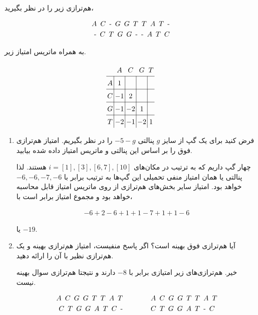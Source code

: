 \documentclass{scribe-cgenomics}
\begin{document}
\bigbreak
\begin{prob}
هم‌ترازی زیر را در نظر بگیرید،

\begin{align*}
A \enspace C \enspace \text{-} \enspace G \enspace G \enspace T \enspace T \enspace A \enspace T \enspace \text{-} \\
\text{-} \enspace C \enspace T \enspace G \enspace G \enspace \text{-} \enspace \text{-} \enspace A \enspace T \enspace C \\
\end{align*}

به همراه ماتریس امتیاز زیر.

$$
\arraycolsep=1.4pt\def\arraystretch{1.5}
\begin{array}{c|c|c|c|c}
 & A & C & G & T \\ \hline
A & 1 & & & \\ \hline
C & -1 & 2 & & \\ \hline
G & -1 & -2 & 1 & \\ \hline
T & -2 & -1 & -2 & 1
\end{array}
$$

\begin{enumerate}
\item{
فرض کنید برای یک گپ از سایز
$g$
پنالتی
$-5-g$
را در نظر بگیریم. امتیاز هم‌ترازی فوق را بر اساس این پنالتی و ماتریس امتیاز داده شده بیابید.


\begin{حل}
چهار گپ داریم که به ترتیب در مکان‌های
$i = [1], [3], [6, 7], [10]$
هستند. لذا پنالتی یا همان امتیاز منفی تحمیلی این گپ‌ها به ترتیب برابر با
$-6, -6, -7, -6$
خواهد بود. امتیاز سایر بخش‌های هم‌ترازی از روی ماتریس امتیاز قابل محاسبه خواهد بود و مجموع امتیاز برابر است با،

\begin{align*}
-6 + 2 - 6 + 1 + 1 - 7 + 1 + 1 - 6
\end{align*}

یا
$-19$.
\end{حل}


}
\item{
آیا هم‌ترازی فوق بهینه است؟ اگر پاسخ منفیست، امتیاز هم‌ترازی بهینه و یک هم‌ترازی نظیر با آن را ارائه دهید.


\begin{حل}
خیر. هم‌ترازی‌های زیر امتیازی برابر با
$-8$
دارند و نتیجتا هم‌ترازی سوال بهینه نیست.

\begin{align*}
A \enspace C \enspace G \enspace G \enspace T \enspace T \enspace A \enspace T \qquad \qquad & A \enspace C \enspace G \enspace G \enspace T \enspace T \enspace A \enspace T \\
C \enspace T \enspace G \enspace G \enspace A \enspace T \enspace C \enspace \text{-} \qquad \qquad & C \enspace T \enspace G \enspace G \enspace A \enspace T \enspace \text{-} \enspace C \\
\end{align*}


\end{حل}}
\end{enumerate}
\end{prob}
\end{document}
